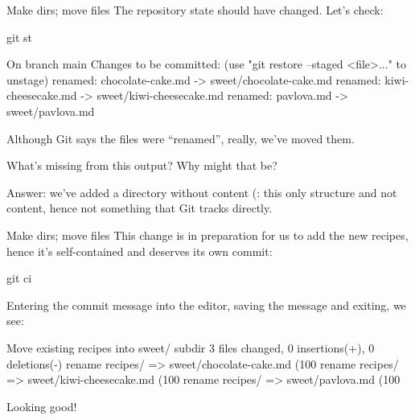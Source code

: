 \documentclass{git_course}
\begin{document}
\begin{frame}[fragile]{Make dirs; move files}
    The repository state should have changed.  Let's check:
    \begin{shellcode}
        git st
    \end{shellcode}
    \begin{outputcode}
On branch main
Changes to be committed:
  (use "git restore --staged <file>..." to unstage)
        renamed:    chocolate-cake.md -> sweet/chocolate-cake.md
        renamed:    kiwi-cheesecake.md -> sweet/kiwi-cheesecake.md
        renamed:    pavlova.md -> sweet/pavlova.md
    \end{outputcode}
    Although Git says the files were ``renamed'', really, we've moved them.

    What's missing from this output?  Why might that be?

    Answer: we've added a directory without content (: this
    only structure and not content, hence not something that Git tracks
    directly.
\end{frame}

\begin{frame}[fragile]{Make dirs; move files}
    This change is in preparation for us to add the new recipes, hence it's
    self-contained and deserves its own commit:
    \begin{shellcode}
        git ci
    \end{shellcode}
    Entering the commit message into the editor, saving the message and
    exiting, we see:
    \begin{outputcode}
[main 8705e91] Move existing recipes into sweet/ subdir
 3 files changed, 0 insertions(+), 0 deletions(-)
 rename recipes/{ => sweet}/chocolate-cake.md (100%
 rename recipes/{ => sweet}/kiwi-cheesecake.md (100%
 rename recipes/{ => sweet}/pavlova.md (100%
    \end{outputcode}

    Looking good!
\end{frame}
\end{document}
